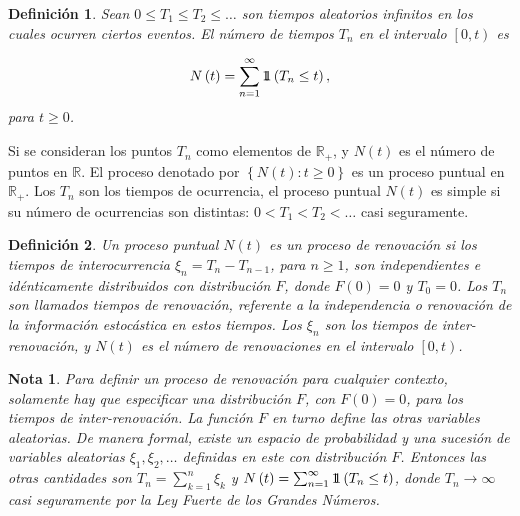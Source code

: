 \documentclass{article}
\newtheorem{Def}{Definición}[section]
\newtheorem{Note}{Nota}%
\newcommand{\rea}{\mathbb{R}}
\newcommand{\indora}{\mbox{$1$\hspace{-0.8ex}$1$}}
\numberwithin{equation}{section}
\begin{document}
\begin{Def}\label{Def.Tn}
Sean $0\leq T_{1}\leq T_{2}\leq \ldots$ son tiempos aleatorios infinitos en los cuales ocurren ciertos eventos. El n\'umero de tiempos $T_{n}$ en el intervalo $\left[0,t\right)$ es

\begin{eqnarray}
N\left(t\right)=\sum_{n=1}^{\infty}\indora\left(T_{n}\leq t\right),
\end{eqnarray}
para $t\geq0$.
\end{Def}

Si se consideran los puntos $T_{n}$ como elementos de $\rea_{+}$, y $N\left(t\right)$ es el n\'umero de puntos en $\rea$. El proceso denotado por $\left\{N\left(t\right):t\geq0\right\}$ es un proceso puntual en $\rea_{+}$. Los $T_{n}$ son los tiempos de ocurrencia, el proceso puntual $N\left(t\right)$ es simple si su n\'umero de ocurrencias son distintas: $0<T_{1}<T_{2}<\ldots$ casi seguramente.

\begin{Def}
Un proceso puntual $N\left(t\right)$ es un proceso de renovaci\'on si los tiempos de interocurrencia $\xi_{n}=T_{n}-T_{n-1}$, para $n\geq1$, son independientes e id\'enticamente distribuidos con distribuci\'on $F$, donde $F\left(0\right)=0$ y $T_{0}=0$. Los $T_{n}$ son llamados tiempos de renovaci\'on, referente a la independencia o renovaci\'on de la informaci\'on estoc\'astica en estos tiempos. Los $\xi_{n}$ son los tiempos de inter-renovaci\'on, y $N\left(t\right)$ es el n\'umero de renovaciones en el intervalo $\left[0,t\right)$.
\end{Def}


\begin{Note}
Para definir un proceso de renovaci\'on para cualquier contexto, solamente hay que especificar una distribuci\'on $F$, con $F\left(0\right)=0$, para los tiempos de inter-renovaci\'on. La funci\'on $F$ en turno define las otras variables aleatorias. De manera formal, existe un espacio de probabilidad y una sucesi\'on de variables aleatorias $\xi_{1},\xi_{2},\ldots$ definidas en este con distribuci\'on $F$. Entonces las otras cantidades son $T_{n}=\sum_{k=1}^{n}\xi_{k}$ y $N\left(t\right)=\sum_{n=1}^{\infty}\indora\left(T_{n}\leq t\right)$, donde $T_{n}\rightarrow\infty$ casi seguramente por la Ley Fuerte de los Grandes N\'umeros.
\end{Note}

\end{document}
